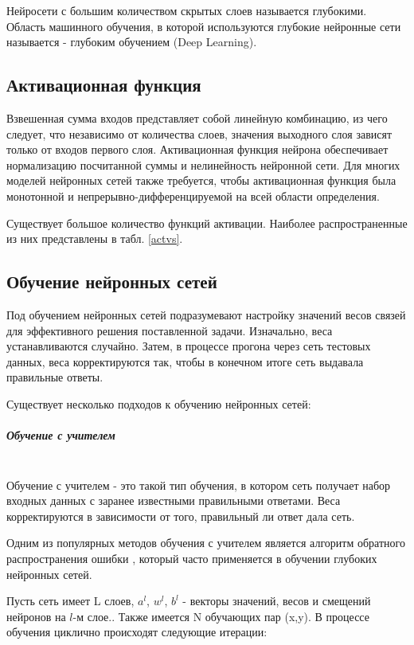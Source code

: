 Нейросети с большим количеством скрытых слоев называется глубокими. Область машинного обучения, в которой используются глубокие нейронные сети называется - глубоким обучением (Deep Learning).     

\subsection{Активационная функция}
\label{sec:activation}
Взвешенная сумма входов представляет собой линейную комбинацию, из чего следует, что независимо от количества слоев, значения выходного слоя зависят только от входов первого слоя. 
Активационная функция нейрона обеспечивает нормализацию посчитанной суммы и нелинейность нейронной сети. Для многих моделей нейронных сетей также требуется, чтобы активационная функция была монотонной и непрерывно-дифференцируемой на всей области определения.

Существует большое количество функций активации. Наиболее распространенные из них представлены в табл. \ref{actvs}.



\subsection{Обучение нейронных сетей}
Под обучением нейронных сетей подразумевают настройку значений весов связей для эффективного решения поставленной задачи. Изначально, веса устанавливаются случайно. Затем, в процессе прогона через сеть тестовых данных, веса корректируются так, чтобы в конечном итоге сеть выдавала правильные ответы. 

Существует несколько подходов к обучению нейронных сетей:

\subparagraph{Обучение с учителем} \mbox{} \\
Обучение с учителем - это такой тип обучения, в котором сеть получает набор входных данных с заранее известными правильными ответами. Веса корректируются в зависимости от того, правильный ли ответ дала сеть. 

Одним из популярных методов обучения с учителем является алгоритм обратного распространения ошибки \cite{Nielsen2015}, который часто применяется в обучении глубоких нейронных сетей. 

Пусть сеть имеет L слоев, $a^l$, $w_{}^l$, $b^l$ - векторы значений, весов и смещений нейронов на $l$-м слое.. Также имеется N обучающих пар (x,y). 
В процессе обучения циклично происходят следующие итерации: 

